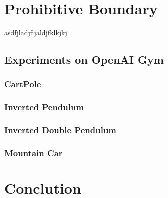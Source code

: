 \documentclass[journal]{IEEEtran}
\begin{document}
\section{Prohibitive Boundary}

asdfjladjfljaldjfklkjkj

\subsection{Experiments on OpenAI Gym}
\subsubsection{CartPole}
\subsubsection{Inverted Pendulum}
\subsubsection{Inverted Double Pendulum}
\subsubsection{Mountain Car}
\subsubsection{}


\section{Conclution}






\end{document}
